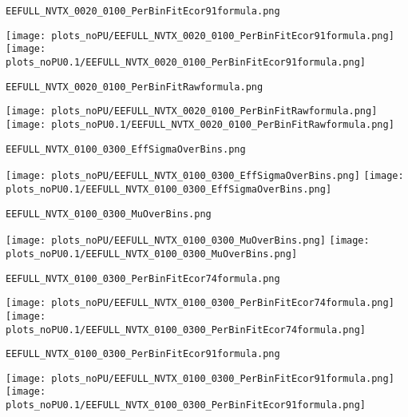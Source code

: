 \begin{frame}[fragile]
\begin{verbatim}
EEFULL_NVTX_0020_0100_PerBinFitEcor91formula.png
\end{verbatim}
\texttt{[image: plots\_noPU/EEFULL\_NVTX\_0020\_0100\_PerBinFitEcor91formula.png]}
\texttt{[image: plots\_noPU0.1/EEFULL\_NVTX\_0020\_0100\_PerBinFitEcor91formula.png]}
\end{frame}
\begin{frame}[fragile]
\begin{verbatim}
EEFULL_NVTX_0020_0100_PerBinFitRawformula.png
\end{verbatim}
\texttt{[image: plots\_noPU/EEFULL\_NVTX\_0020\_0100\_PerBinFitRawformula.png]}
\texttt{[image: plots\_noPU0.1/EEFULL\_NVTX\_0020\_0100\_PerBinFitRawformula.png]}
\end{frame}
\begin{frame}[fragile]
\begin{verbatim}
EEFULL_NVTX_0100_0300_EffSigmaOverBins.png
\end{verbatim}
\texttt{[image: plots\_noPU/EEFULL\_NVTX\_0100\_0300\_EffSigmaOverBins.png]}
\texttt{[image: plots\_noPU0.1/EEFULL\_NVTX\_0100\_0300\_EffSigmaOverBins.png]}
\end{frame}
\begin{frame}[fragile]
\begin{verbatim}
EEFULL_NVTX_0100_0300_MuOverBins.png
\end{verbatim}
\texttt{[image: plots\_noPU/EEFULL\_NVTX\_0100\_0300\_MuOverBins.png]}
\texttt{[image: plots\_noPU0.1/EEFULL\_NVTX\_0100\_0300\_MuOverBins.png]}
\end{frame}
\begin{frame}[fragile]
\begin{verbatim}
EEFULL_NVTX_0100_0300_PerBinFitEcor74formula.png
\end{verbatim}
\texttt{[image: plots\_noPU/EEFULL\_NVTX\_0100\_0300\_PerBinFitEcor74formula.png]}
\texttt{[image: plots\_noPU0.1/EEFULL\_NVTX\_0100\_0300\_PerBinFitEcor74formula.png]}
\end{frame}
\begin{frame}[fragile]
\begin{verbatim}
EEFULL_NVTX_0100_0300_PerBinFitEcor91formula.png
\end{verbatim}
\texttt{[image: plots\_noPU/EEFULL\_NVTX\_0100\_0300\_PerBinFitEcor91formula.png]}
\texttt{[image: plots\_noPU0.1/EEFULL\_NVTX\_0100\_0300\_PerBinFitEcor91formula.png]}
\end{frame}
